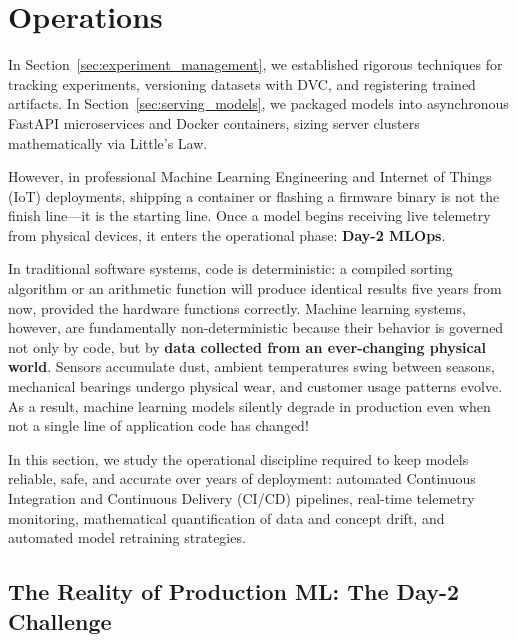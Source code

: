 \section{Operations}\label{sec:ml_operations}

In Section~\ref{sec:experiment_management}, we established rigorous techniques for tracking experiments, versioning datasets with DVC, and registering trained artifacts. In Section~\ref{sec:serving_models}, we packaged models into asynchronous FastAPI microservices and Docker containers, sizing server clusters mathematically via Little's Law.

However, in professional Machine Learning Engineering and Internet of Things (IoT) deployments, shipping a container or flashing a firmware binary is not the finish line---it is the starting line. Once a model begins receiving live telemetry from physical devices, it enters the operational phase: \textbf{Day-2 MLOps}.

In traditional software systems, code is deterministic: a compiled sorting algorithm or an arithmetic function will produce identical results five years from now, provided the hardware functions correctly. Machine learning systems, however, are fundamentally non-deterministic because their behavior is governed not only by code, but by \textbf{data collected from an ever-changing physical world}. Sensors accumulate dust, ambient temperatures swing between seasons, mechanical bearings undergo physical wear, and customer usage patterns evolve. As a result, machine learning models silently degrade in production even when not a single line of application code has changed!

In this section, we study the operational discipline required to keep models reliable, safe, and accurate over years of deployment: automated Continuous Integration and Continuous Delivery (CI/CD) pipelines, real-time telemetry monitoring, mathematical quantification of data and concept drift, and automated model retraining strategies.

\subsection{The Reality of Production ML: The Day-2 Challenge}\label{subsec:day2_challenge}

